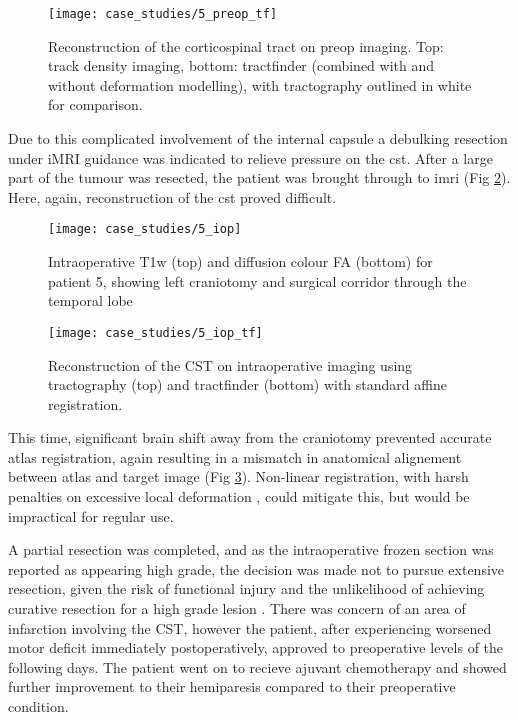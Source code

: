 \begin{figure}
  \centering
  \texttt{[image: case\_studies/5\_preop\_tf]}
  \caption{Reconstruction of the corticospinal tract on preop imaging. Top: track density imaging, bottom: tractfinder (combined with and without deformation modelling), with tractography outlined in white for comparison.}
  \label{fig:5p_cst}
\end{figure}

Due to this complicated involvement of the internal capsule a debulking resection under iMRI guidance was indicated to relieve pressure on the \gls{cst}.
After a large part of the tumour was resected, the patient was brought through to \gls{imri} (Fig \ref{fig:5i}).
Here, again, reconstruction of the \gls{cst} proved difficult.

\begin{figure}
  \centering
  \texttt{[image: case\_studies/5\_iop]}
  \caption{Intraoperative T1w (top) and diffusion colour FA (bottom) for patient 5, showing left craniotomy and surgical corridor through the temporal lobe}
  \label{fig:5i}
\end{figure}

\begin{figure}
  \centering
  \texttt{[image: case\_studies/5\_iop\_tf]}
  \caption{Reconstruction of the CST on intraoperative imaging using tractography (top) and tractfinder (bottom) with standard affine registration.}
  \label{fig:5i_cst}
\end{figure}

This time, significant brain shift away from the craniotomy prevented accurate atlas registration, again resulting in a mismatch in anatomical alignement between atlas and target image (Fig \ref{fig:5i_cst}).
Non-linear registration, with harsh penalties on excessive local deformation  , could mitigate this, but would be impractical for regular use.

A partial resection was completed, and as the intraoperative frozen section  was reported as appearing high grade, the decision was made not to pursue extensive resection, given the risk of functional injury and the unlikelihood of achieving curative resection for a high grade lesion .
There was concern of an area of infarction involving the CST, however the patient, after experiencing worsened motor deficit immediately postoperatively, approved to preoperative levels of the following days.
The patient went on to recieve ajuvant chemotherapy and showed further improvement to their hemiparesis compared to their preoperative condition.

